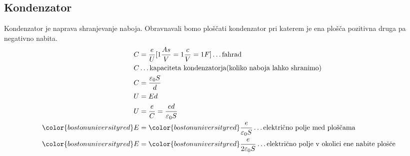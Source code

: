 {\color{indiagreen}\subsection{Kondenzator}}
Kondenzator je naprava shranjevanje naboja. Obravnavali bomo ploščati kondenzator pri katerem je ena plošča pozitivna druga pa negativno nabita.\\
\begin{align*}
	C &= \frac{e}{U}[1\frac{As}{V} = 1\frac{c}{V} = 1F] \dots \text{fahrad}\\
	C &\dots \text{kapaciteta kondenzatorja(koliko naboja lahko shranimo)}\\
	C &= \frac{\varepsilon_0 S}{d}\\
	U &= Ed\\
	U &= \frac{e}{C} = \frac{ed}{\varepsilon_0 S}\\
	{\color{bostonuniversityred}E} &= {\color{bostonuniversityred}\frac{e}{\varepsilon_0 S}} \dots \text{električno polje med ploščama}\\
	{\color{bostonuniversityred}E} &= {\color{bostonuniversityred}\frac{e}{2\varepsilon_0 S}} \dots \text{električno polje v okolici ene nabite plošče}\\
\end{align*}
